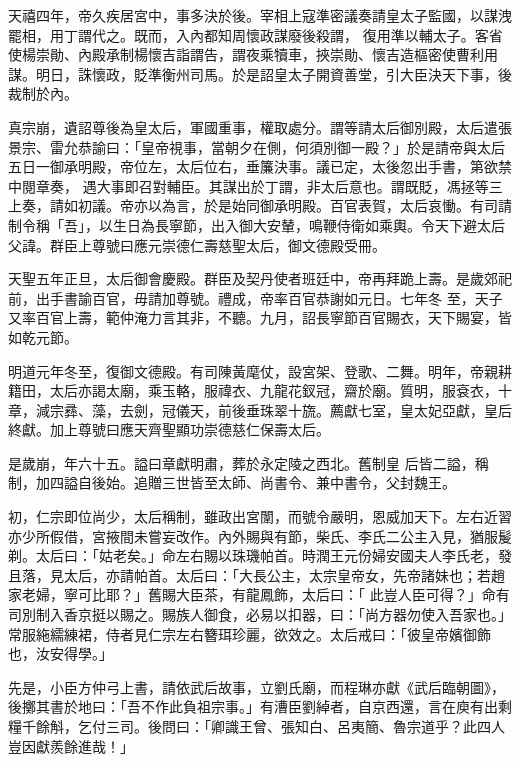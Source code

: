 \begin{pinyinscope}
 天禧四年，帝久疾居宮中，事多決於後。宰相上寇準密議奏請皇太子監國，以謀洩罷相，用丁謂代之。既而，入內都知周懷政謀廢後殺謂，
 復用準以輔太子。客省使楊崇勛、內殿承制楊懷吉詣謂告，謂夜乘犢車，挾崇勛、懷吉造樞密使曹利用謀。明日，誅懷政，貶準衡州司馬。於是詔皇太子開資善堂，引大臣決天下事，後裁制於內。



 真宗崩，遺詔尊後為皇太后，軍國重事，權取處分。謂等請太后御別殿，太后遣張景宗、雷允恭諭曰：「皇帝視事，當朝夕在側，何須別御一殿？」於是請帝與太后五日一御承明殿，帝位左，太后位右，垂簾決事。議已定，太後忽出手書，第欲禁中閱章奏，
 遇大事即召對輔臣。其謀出於丁謂，非太后意也。謂既貶，馮拯等三上奏，請如初議。帝亦以為言，於是始同御承明殿。百官表賀，太后哀慟。有司請制令稱「吾」，以生日為長寧節，出入御大安輦，鳴鞭侍衛如乘輿。令天下避太后父諱。群臣上尊號曰應元崇德仁壽慈聖太后，御文德殿受冊。



 天聖五年正旦，太后御會慶殿。群臣及契丹使者班廷中，帝再拜跪上壽。是歲郊祀前，出手書諭百官，毋請加尊號。禮成，帝率百官恭謝如元日。七年冬
 至，天子又率百官上壽，範仲淹力言其非，不聽。九月，詔長寧節百官賜衣，天下賜宴，皆如乾元節。



 明道元年冬至，復御文德殿。有司陳黃麾仗，設宮架、登歌、二舞。明年，帝親耕籍田，太后亦謁太廟，乘玉輅，服禕衣、九龍花釵冠，齋於廟。質明，服袞衣，十章，減宗彞、藻，去劍，冠儀天，前後垂珠翠十旒。薦獻七室，皇太妃亞獻，皇后終獻。加上尊號曰應天齊聖顯功崇德慈仁保壽太后。



 是歲崩，年六十五。謚曰章獻明肅，葬於永定陵之西北。舊制皇
 后皆二謚，稱制，加四謚自後始。追贈三世皆至太師、尚書令、兼中書令，父封魏王。



 初，仁宗即位尚少，太后稱制，雖政出宮闈，而號令嚴明，恩威加天下。左右近習亦少所假借，宮掖間未嘗妄改作。內外賜與有節，柴氏、李氏二公主入見，猶服髲剃。太后曰：「姑老矣。」命左右賜以珠璣帕首。時潤王元份婦安國夫人李氏老，發且落，見太后，亦請帕首。太后曰：「大長公主，太宗皇帝女，先帝諸妹也；若趙家老婦，寧可比耶？」舊賜大臣茶，有龍鳳飾，太后曰：「
 此豈人臣可得？」命有司別制入香京挺以賜之。賜族人御食，必易以扣器，曰：「尚方器勿使入吾家也。」常服絁繻練裙，侍者見仁宗左右簪珥珍麗，欲效之。太后戒曰：「彼皇帝嬪御飾也，汝安得學。」



 先是，小臣方仲弓上書，請依武后故事，立劉氏廟，而程琳亦獻《武后臨朝圖》，後擲其書於地曰：「吾不作此負祖宗事。」有漕臣劉綽者，自京西還，言在庾有出剩糧千餘斛，乞付三司。後問曰：「卿識王曾、張知白、呂夷簡、魯宗道乎？此四人豈因獻羨餘進哉！」




\end{pinyinscope}
